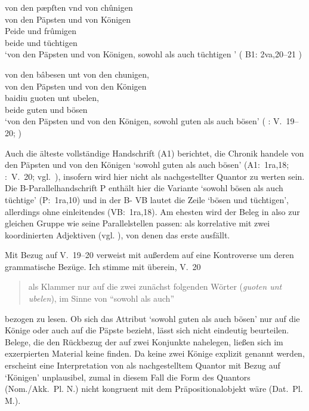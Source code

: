 \begin{exe}
\ex \begin{xlist}
	\ex \label{ex:kcexcl1}
		\gll von den pæpſten vnd von chûnigen \\
			von den Päpsten und von Königen \\
	\sn \gll Peide und frûmigen \\
			beide und tüchtigen \\
		\trans `von den Päpsten und von Königen, sowohl als auch tüchtigen
			'
			(%
				B1: 2va,20--21%
			)

	\ex \label{ex:kcexcl1_schroeder}
		\gll von den bâbesen unt von den chunigen, \\
			von den Päpsten und von den Königen \\
	\sn \gll baidiu guoten unt ubelen, \\
			beide guten und bösen \\
		\trans `von den Päpsten und von den Königen, sowohl guten als auch
			bösen'
			(%
				\KC: V.~19--20;
				\cite[79]{schroeder1895}%
			)
\end{xlist}
\end{exe}

Auch die älteste vollständige Handschrift (A1) berichtet, die Chronik handele
von den Päpsten und von den Königen  `sowohl guten
als auch bösen' (A1:~1ra,18; \KC:~V.~20; vgl.~\cite[79]{schroeder1895}),
insofern wird  hier nicht als nachgestellter Quantor zu werten
sein. Die B-\allowbreak{}Pa\-ral\-lel\-hand\-schrift P enthält hier die
Variante  `sowohl bösen als auch
tüchtige' (P:~1ra,10) und in der B- VB
lautet die Zeile  `bösen und tüchtigen', allerdings
ohne einleitendes  (VB:~1ra,18). Am ehesten wird der Beleg in
 also zur gleichen Gruppe wie seine
Parallelstellen passen:  als korrelative
 mit zwei koordinierten
Adjektiven (vgl. ), von
denen das erste ausfällt.

Mit Bezug auf V.~19--20 verweist \citet[26, Fußnote 45]{weis2022} mit
\citet[55, Fußnote 87]{dickhutbielsky2015} außerdem auf eine Kontroverse um
deren grammatische Bezüge. Ich stimme mit \citet[239]{haupt2019} überein, V.~20
\blockquote{als Klammer nur auf die zwei zunächst folgenden Wörter
(\textit{guoten unt ubelen}), im Sinne von \enquote{sowohl als auch}} bezogen
zu lesen. Ob sich das Attribut 
`sowohl guten als auch bösen' nur auf die Könige oder auch auf die Päpste
bezieht, lässt sich nicht eindeutig beurteilen. Belege, die den
Rückbezug der   auf zwei Konjunkte nahelegen,
ließen sich im exzerpierten Material keine finden. Da keine zwei Könige
explizit genannt werden, erscheint eine Interpretation von  als
nachgestelltem Quantor mit Bezug auf  `Königen' unplausibel,
zumal in diesem Fall die Form des Quantors (Nom./Akk.~Pl. N.) nicht kongruent
mit dem Präpositionalobjekt wäre (Dat.~Pl. M.).


